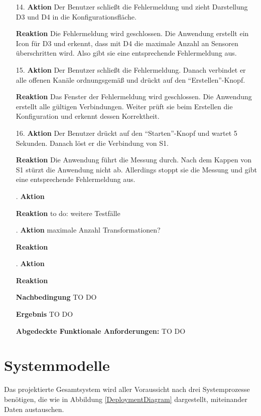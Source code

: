 \documentclass[parskip=full]{scrartcl}
\begin{document}
\begin{itemize}
\begin{itemize}
\item [14.]\textbf{Aktion} Der Benutzer schließt die Fehlermeldung und zieht Darstellung D3 und D4 in die Konfigurationsfläche.
\item []\textbf{Reaktion} Die Fehlermeldung wird geschlossen. Die Anwendung erstellt ein Icon für D3 und erkennt, dass mit D4 die maximale Anzahl an Sensoren überschritten wird. Also gibt sie eine entsprechende Fehlermeldung aus.
\item [15.]\textbf{Aktion} Der Benutzer schließt die Fehlermeldung. Danach verbindet er alle offenen Kanäle ordnungsgemäß und drückt auf den "`Erstellen"'-Knopf.
\item []\textbf{Reaktion} Das Fenster der Fehlermeldung wird geschlossen. Die Anwendung erstellt alle gültigen Verbindungen. Weiter prüft sie beim Erstellen die Konfiguration und erkennt dessen Korrektheit. 
\item [16.]\textbf{Aktion} Der Benutzer drückt auf den "`Starten"'-Knopf und wartet 5 Sekunden. Danach löst er die Verbindung von S1.
\item []\textbf{Reaktion} Die Anwendung führt die Messung durch. Nach dem Kappen von S1 stürzt die Anwendung nicht ab. Allerdings stoppt sie die Messung und gibt eine entsprechende Fehlermeldung aus. 
\item [.]\textbf{Aktion} 
\item []\textbf{Reaktion} to do: weitere Testfälle
\item [.]\textbf{Aktion} maximale Anzahl Transformationen?
\item []\textbf{Reaktion}
\item [.]\textbf{Aktion} 
\item []\textbf{Reaktion}

\item []\textbf{Nachbedingung} TO DO
\item []\textbf{Ergebnis} TO DO

\item []\textbf{Abgedeckte Funktionale Anforderungen:} TO DO

\end{itemize}


\end{itemize}

\section{Systemmodelle}

Das projektierte Gesamtsystem wird aller Voraussicht nach drei Systemprozesse benötigen, die wie in Abbildung \ref{DeploymentDiagram} dargestellt, miteinander Daten austauschen.
\end{document}
